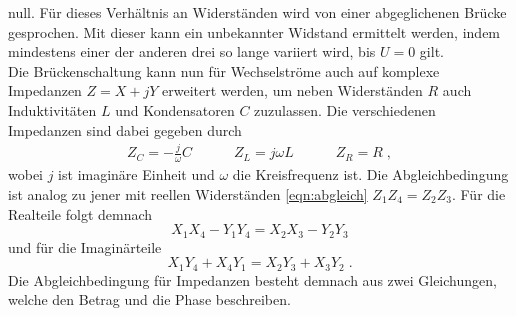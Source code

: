 null. Für dieses Verhältnis an Widerständen wird von einer abgeglichenen Brücke gesprochen. Mit dieser kann ein unbekannter Widstand
ermittelt werden, indem mindestens einer der anderen drei so lange variiert wird, bis $U=0$ gilt.
\\\noindent
Die Brückenschaltung kann nun für Wechselströme auch auf komplexe Impedanzen $Z=X+jY$ erweitert werden, um neben Widerständen $R$ auch
Induktivitäten $L$ und Kondensatoren $C$ zuzulassen. Die verschiedenen Impedanzen sind dabei gegeben durch
\begin{align*}
    Z_C=-\frac{j}{\omega}C \qquad\quad
    Z_L=j\omega L          \qquad\quad
    Z_R=R \;,
\end{align*}
wobei $j$ ist imaginäre Einheit und $\omega$ die Kreisfrequenz ist. Die Abgleichbedingung ist analog zu jener mit reellen Widerständen
\eqref{eqn:abgleich} $Z_1Z_4=Z_2Z_3$. Für die Realteile folgt demnach
\begin{equation*}
    X_1X_4-Y_1Y_4=X_2X_3-Y_2Y_3
\end{equation*}
und für die Imaginärteile
\begin{equation*}
    X_1Y_4+X_4Y_1=X_2Y_3+X_3Y_2 \;.
\end{equation*}
Die Abgleichbedingung für Impedanzen besteht demnach aus zwei Gleichungen, welche den Betrag und die Phase beschreiben.

